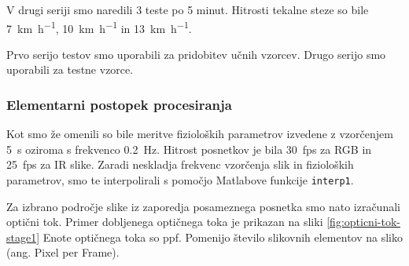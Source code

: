 V drugi seriji smo naredili 3 teste po 5 minut. Hitrosti tekalne steze so bile  \SI{7}{\km\per\hour}, \SI{10}{\km\per\hour} in \SI{13}{\km\per\hour}.

Prvo serijo testov smo uporabili za pridobitev učnih vzorcev. Drugo serijo smo uporabili za testne vzorce.


\subsubsection{Elementarni postopek procesiranja}\label{sec:elementarni-postopek}
Kot smo že omenili so bile meritve fizioloških parametrov izvedene z vzorčenjem \SI{5}{\s} oziroma s frekvenco \SI{0.2}{\hertz}. Hitrost posnetkov je bila \SI{30}{fps} za RGB in \SI{25}{fps} za IR slike. Zaradi neskladja frekvenc vzorčenja slik in fizioloških parametrov, smo te interpolirali s pomočjo Matlabove funkcije \texttt{interp1}.
 
Za izbrano področje slike iz zaporedja posameznega posnetka smo nato izračunali optični tok. Primer dobljenega optičnega toka je prikazan na sliki \ref{fig:opticni-tok-stage1} Enote optičnega toka so \si{ppf}. Pomenijo število slikovnih elementov na sliko (ang. Pixel per Frame).


